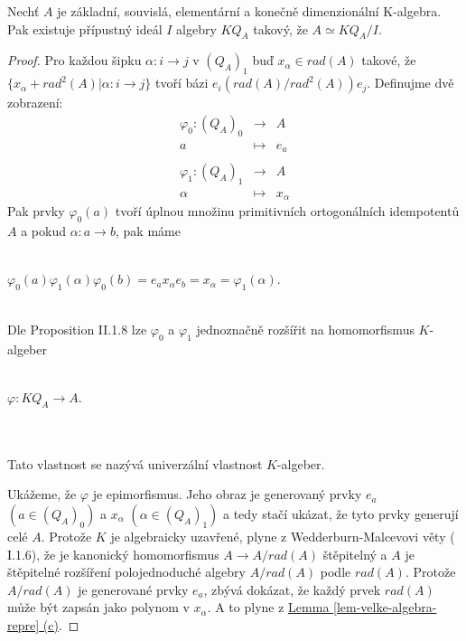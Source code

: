    \begin{thm}
      Nechť $A$ je základní, souvislá, elementární a konečně dimenzionální K-algebra. Pak 
      existuje přípustný ideál $I$ algebry $KQ_A$ takový, že $A\simeq KQ_A/I$.
    \end{thm}
    \begin{proof}
      Pro každou šipku $\alpha: i\to j$ v $(Q_A)_1$ buď $x_\alpha\in rad (A)$ takové, že 
      $\{x_\alpha+rad^2(A)|\alpha:i\to j\}$ tvoří bázi $e_i(rad(A)/rad^2(A))e_j$. 
      Definujme dvě zobrazení:
      \begin{eqnarray}
         \varphi_0:(Q_A)_0 &\to& A \nonumber \\
         a &\mapsto& e_a \nonumber \\ \nonumber \\
         \varphi_1:(Q_A)_1 &\to& A \nonumber \\
         \alpha &\mapsto& x_\alpha \nonumber
      \end{eqnarray}
      Pak prvky $\varphi_0(a)$ tvoří úplnou množinu primitivních ortogonálních 
      idempotentů $A$ a pokud $\alpha:a\to b$, pak máme 
      \\\\\centerline{$
        \varphi_0(a)\varphi_1(\alpha)\varphi_0(b)=e_ax_\alpha e_b=x_\alpha=\varphi_1(\alpha)
      $.}\\
      
      Dle \cite{1} Proposition II.1.8 lze $\varphi_0$ a $\varphi_1$ jednoznačně rozšířit na 
      homomorfismus  $K$-algeber 
      \\\\\centerline{$\varphi: KQ_A\to A$.}\\\\ 
      Tato vlastnost se nazývá 
      univerzální vlastnost $K$-algeber. 
      
      Ukážeme, že $\varphi$ je epimorfismus. Jeho obraz je generovaný prvky $e_a$ 
      $(a\in (Q_A)_0)$ a $x_\alpha$ $(\alpha\in (Q_A)_1)$ a tedy stačí ukázat, 
      že tyto prvky generují celé $A$. Protože $K$ je algebraicky uzavřené, plyne 
      z Wedderburn-Malcevovi věty (\cite{1} I.1.6), že je kanonický homomorfismus 
      $A \to A/rad (A)$  štěpitelný a $A$ je štěpitelné rozšíření polojednoduché 
      algebry $A/rad( A)$ podle $rad (A)$. Protože $A/rad( A)$ je generované 
      prvky $e_a$, zbývá dokázat, že každý prvek $rad(A)$ může být zapsán jako 
      polynom v $x_\alpha$. A to plyne z 
      \hyperref[lem-velke-algebra-repre]{Lemma \ref*{lem-velke-algebra-repre} (c)}.
      

\end{proof}
